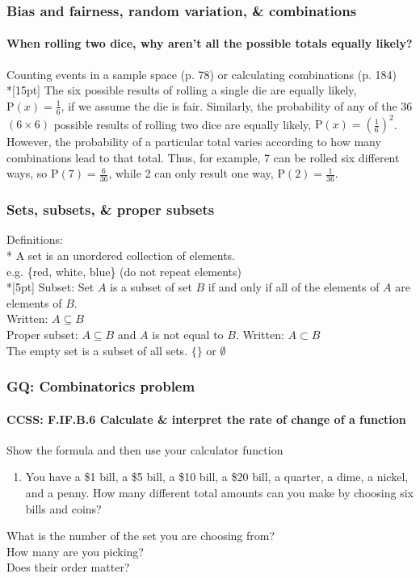\documentclass{beamer}
\begin{document}
\frame
{
  \frametitle{Bias and fairness, random variation, \& combinations}
  \framesubtitle{When rolling two dice, why aren't all the possible totals equally likely?}
  Counting events in a \alert{sample space} (p. 78) or calculating \alert{combinations} (p. 184) \\*[15pt]
  The six possible results of rolling a single die are equally likely, $\mathrm P(x)=\frac{1}{6}$, if we assume the die is fair. Similarly, the probability of any of the 36 $(6 \times 6)$ possible results of rolling two dice are equally likely, $\mathrm P(x)=(\frac{1}{6})^2$. However, the probability of a particular total varies according to how many combinations lead to that total. Thus, for example, 7 can be rolled six different ways, so $\mathrm P(7)=\frac{6}{36}$, while 2 can only result one way, $\mathrm P(2)=\frac{1}{36}$.

}

\frame
{
  \frametitle{Sets, subsets, \& proper subsets}

  Definitions:\\*
  A \alert{set} is an unordered collection of elements.\\ e.g. \{red, white, blue\} (do not repeat elements)\\*[5pt]
  \alert{Subset}: Set $A$ is a subset of set $B$ if and only if all of the elements of $A$ are elements of $B$.\\
  Written: $A \subseteq B$\\[5pt]
  \alert{Proper subset}: $A \subseteq B$ and $A$ is not equal to $B$. Written: $A \subset B$\\[5pt]
  The \alert{empty set} is a subset of all sets. $\{\} \text{ or } \emptyset$

}


\frame
{
  \frametitle{GQ: Combinatorics problem}
  \framesubtitle{CCSS: F.IF.B.6 Calculate \& interpret the rate of change of a function}

  \begin{block}{Show the formula and then use your calculator function}
  \begin{enumerate}
      \item You have a \$1 bill, a \$5 bill, a \$10 bill, a \$20 bill, a quarter, a dime, a nickel, and a penny. How many different total amounts can you make by choosing six bills and coins?
  \end{enumerate}
  \end{block}
  What is the number of the set you are choosing from?\\%
  How many are you picking?\\%
  Does their order matter?
}
\end{document}
